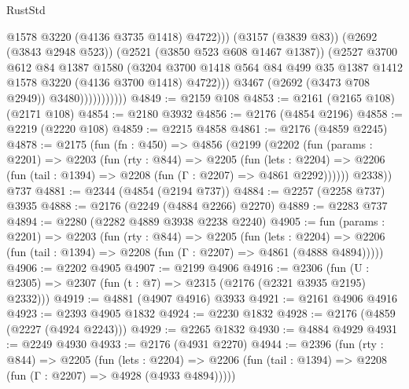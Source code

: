 \begin{lexlean}{RustStd}
\begin{coremodule}
{\begin{coremodule}
{{{{{{{{{{                                  @1578
                                  @3220
                                  (@4136 @3735 @1418)
                                  @4722)))
                            (@3157 (@3839 @83))
                            (@2692 (@3843 @2948 @523))
                            (@2521 (@3850 @523 @608 @1467 @1387))
                            (@2527
                              @3700
                              @612
                              @84
                              @1387
                              @1580
                              (@3204
                                @3700
                                @1418
                                @564
                                @84
                                @499
                                @35
                                @1387
                                @1412
                                @1578
                                @3220
                                (@4136 @3700 @1418)
                                @4722)))
                          @3467
                          (@2692 (@3473 @708 @2949))
                          @3480)))))))))))
@4849 := @2159 @108
@4853 := @2161 (@2165 @108) (@2171 @108)
@4854 := @2180 @3932
@4856 := @2176 (@4854 @2196)
@4858 := @2219 (@2220 @108)
@4859 := @2215 @4858
@4861 := @2176 (@4859 @2245)
@4878 := @2175
    (fun (fn : @450) =>
    @4856
      (@2199
        (@2202
          (fun (params : @2201) =>
          @2203
            (fun (rty : @844) =>
            @2205
              (fun (lets : @2204) =>
              @2206 (fun (tail : @1394) => @2208 (fun (Γ : @2207) => @4861 @2292))))))
        @2338))
    @737
@4881 := @2344 (@4854 (@2194 @737))
@4884 := @2257 (@2258 @737) @3935
@4888 := @2176 (@2249 (@4884 @2266) @2270)
@4889 := @2283 @737
@4894 := @2280 (@2282 @4889 @3938 @2238 @2240)
@4905 := fun (params : @2201) =>
  @2203
    (fun (rty : @844) =>
    @2205
      (fun (lets : @2204) =>
      @2206 (fun (tail : @1394) => @2208 (fun (Γ : @2207) => @4861 (@4888 @4894)))))
@4906 := @2202 @4905
@4907 := @2199 @4906
@4916 := @2306 (fun (U : @2305) => @2307 (fun (t : @7) => @2315 (@2176 (@2321 @3935 @2195) @2332)))
@4919 := @4881 (@4907 @4916) @3933
@4921 := @2161 @4906 @4916
@4923 := @2393 @4905 @1832
@4924 := @2230 @1832
@4928 := @2176 (@4859 (@2227 (@4924 @2243)))
@4929 := @2265 @1832
@4930 := @4884 @4929
@4931 := @2249 @4930
@4933 := @2176 (@4931 @2270)
@4944 := @2396
    (fun (rty : @844) =>
    @2205
      (fun (lets : @2204) =>
      @2206 (fun (tail : @1394) => @2208 (fun (Γ : @2207) => @4928 (@4933 @4894)))))
}}}}}}}}}}
\end{coremodule}}
\end{coremodule}
\end{lexlean}
